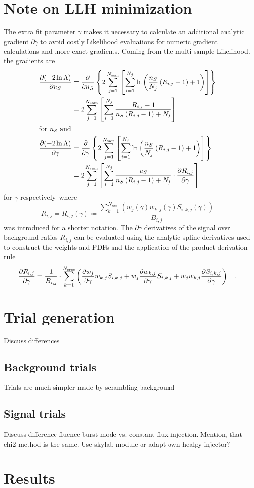 \section{Note on LLH minimization}
The extra fit parameter $\gamma$ makes it necessary to calculate an additional analytic gradient $\partial{\gamma}$ to avoid costly Likelihood evaluations for numeric gradient calculations and more exact gradients.
Coming from the multi sample Likelihood, the gradients are
\begin{align}
  \frac{\partial (-2\ln\Lambda)}{\partial n_S}
  &= \frac{\partial }{\partial n_S}\left\{
      2\sum_{j=1}^{N_\text{sam}} \left[
        \sum_{i=1}^{N_j} \ln\left(
          \frac{n_S}{N_j}\left( R_{i,j} - 1 \right) + 1
        \right)
      \right]
    \right\} \\
  &= 2\sum_{j=1}^{N_\text{sam}} \left[
      \sum_{i=1}^{N_j}
        \frac{R_{i,j} - 1}{n_S\left( R_{i,j} - 1 \right) + N_j}
      \right] \\
  \intertext{for $n_S$ and}
  \frac{\partial (-2\ln\Lambda)}{\partial \gamma}
  &= \frac{\partial }{\partial \gamma}\left\{
      2\sum_{j=1}^{N_\text{sam}} \left[
        \sum_{i=1}^{N_j} \ln\left(
          \frac{n_S}{N_j}\left( R_{i,j} - 1 \right) + 1
        \right)
      \right]
    \right\} \\
  &= 2\sum_{j=1}^{N_\text{sam}} \left[
      \sum_{i=1}^{N_j}
        \frac{n_S}{n_S\left( R_{i,j} - 1 \right) + N_j}\cdot
        \frac{\partial R_{i,j}}{\partial \gamma}
      \right] \\
\end{align}
for $\gamma$ respectively, where
\begin{equation}
  R_{i,j} = R_{i,j}(\gamma)
  \coloneqq \frac{\sum_{k=1}^{N_\text{srcs}}(w_j(\gamma)
                  w_{k,j}(\gamma) S_{i,k,j}(\gamma))}{B_{i,j}}
\end{equation}
was introduced for a shorter notation.
The $\partial{\gamma}$ derivatives of the signal over background ratios $R_{i,j}$ can be evaluated using the analytic spline derivatives used to construct the  weights and PDFs and the application of the product derivation rule
\begin{equation}
  \frac{\partial R_{i,j}}{\partial \gamma}
  = \frac{1}{B_{i,j}}\cdot\sum_{k=1}^{N_\text{srcs}}\left(
      \frac{\partial w_j}{\partial \gamma} w_{k,j} S_{i,k,j} +
      w_j \frac{\partial w_{k,j}}{\partial \gamma} S_{i,k,j} +
      w_j w_{k,j} \frac{\partial S_{i,k,j}}{\partial \gamma}
    \right)
  \quad\text{.}
\end{equation}


\section{Trial generation}
Discuss differences

\subsection*{Background trials}
Trials are much simpler made by scrambling background

\subsection*{Signal trials}
Discuss difference fluence burst mode vs. constant flux injection.
Mention, that chi2 method is the same.
Use skylab module or adapt own healpy injector?


\section{Results}

